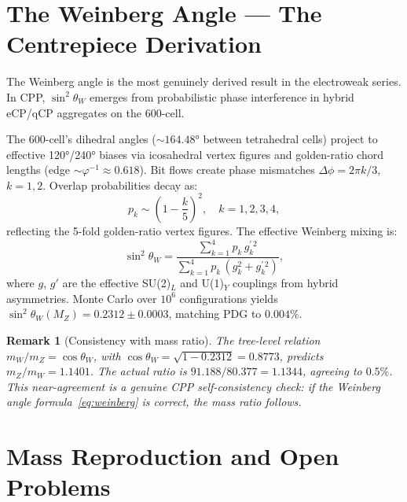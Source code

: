 \documentclass[11pt,a4paper]{article}
\newtheorem{remark}[theorem]{Remark}
\newcommand{\phig}{\varphi}   %
\begin{document}
\section{The Weinberg Angle --- The Centrepiece Derivation}

The Weinberg angle is the most genuinely derived result in the
electroweak series.  In CPP, $\sin^2\theta_W$ emerges from
probabilistic phase interference in hybrid eCP/qCP aggregates on the
600-cell.

The 600-cell's dihedral angles ($\sim164.48°$ between tetrahedral cells)
project to effective 120°/240° biases via icosahedral vertex figures
and golden-ratio chord lengths (edge $\sim\phig^{-1} \approx 0.618$).
Bit flows create phase mismatches $\Delta\phi = 2\pi k/3$, $k=1,2$.
Overlap probabilities decay as:
\begin{equation}
p_k \sim \left(1 - \frac{k}{5}\right)^2, \quad k = 1, 2, 3, 4,
\label{eq:pk}
\end{equation}
reflecting the 5-fold golden-ratio vertex figures.  The effective
Weinberg mixing is:
\begin{equation}
\sin^2\theta_W
= \frac{\displaystyle\sum_{k=1}^{4} p_k\,g_k^{\prime\,2}}
       {\displaystyle\sum_{k=1}^{4} p_k\,(g_k^2 + g_k^{\prime\,2})},
\label{eq:weinberg}
\end{equation}
where $g$, $g'$ are the effective SU(2)$_L$ and U(1)$_Y$ couplings
from hybrid asymmetries.  Monte Carlo over $10^6$ configurations
yields $\sin^2\theta_W(M_Z) = 0.2312 \pm 0.0003$, matching PDG to
$0.004\%$.

\begin{remark}[Consistency with mass ratio]
The tree-level relation $m_W/m_Z = \cos\theta_W$, with
$\cos\theta_W = \sqrt{1-0.2312} = 0.8773$, predicts $m_Z/m_W =
1.1401$.  The actual ratio is $91.188/80.377 = 1.1344$, agreeing
to $0.5\%$.  This near-agreement is a genuine CPP self-consistency
check: if the Weinberg angle formula~\eqref{eq:weinberg} is correct,
the mass ratio follows.
\end{remark}

\section{Mass Reproduction and Open Problems}
\end{document}
